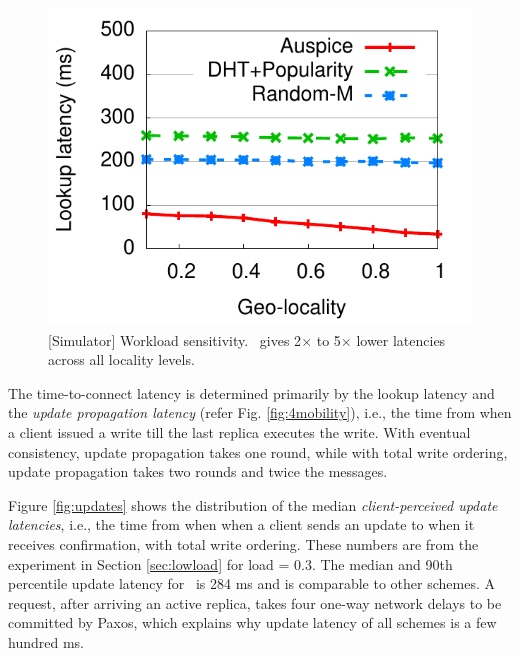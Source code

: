 {\begin{figure}[t]
\includegraphics[scale=0.5]{auspice/graph/medianlatencyVSlocality.pdf}
\vspace{-0.1in}
\caption{[Simulator] Workload sensitivity. \auspice\ gives 2$\times$ to 5$\times$  lower latencies across all locality levels.}
\label{fig:varylocality}
\vspace{-0.1in}
\end{figure}

}


The time-to-connect latency is determined primarily by the lookup latency and the {\em update propagation latency} (refer Fig. \ref{fig:4mobility}), i.e., the time from when a client issued a write till the last replica executes the write. With eventual consistency, update propagation takes one round, while with total write ordering, update propagation takes two rounds and twice the messages.

Figure \ref{fig:updates} shows the distribution of the median {\em client-perceived update latencies}, i.e., the time from when when a client sends an update to when it receives confirmation, with total write ordering.  These numbers are from the experiment in Section  \ref{sec:lowload} for load = 0.3. The median and 90th percentile update latency for \auspice\ is 284 ms and is comparable to other schemes. A request, after arriving an active replica, takes four one-way network delays to be committed by Paxos, which explains why update latency of all schemes is a few hundred ms. 

